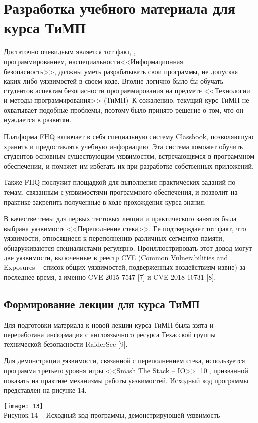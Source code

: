 \section{Разработка учебного материала для курса ТиМП}

Достаточно очевидным является тот факт,  ,  \\программированием, \hfil на\hfil специальности\hfil \hfil<<Информационная\hfil\\ безопасность>>, должны уметь разрабатывать свои программы, не допуская каких-либо уязвимостей в своем коде. Вполне логично было бы обучать студентов аспектам безопасности программирования на предмете <<Технологии и методы программирования>> (ТиМП). К сожалению, текущий курс ТиМП не охватывает подобные проблемы, поэтому было принято решение о том, что он нуждается в развитии.\par 
Платформа FHQ включает в себя специальную систему Classbook, позволяющую хранить и предоставлять учебную информацию. Эта система поможет обучить студентов основным существующим уязвимостям, встречающимся в программном обеспечении, и поможет им избегать их при разработке собственных приложений.\par 
Также FHQ послужит площадкой для выполнения практических заданий по темам, связанным с уязвимостями программного обеспечения, и позволит на практике закрепить полученные в ходе прохождения курса знания.\par
В качестве темы для первых тестовых лекции и практического занятия была выбрана уязвимость <<Переполнение стека>>. Ее подтверждает тот факт, что уязвимости, относящиеся к переполнению различных сегментов памяти, обнаруживаются специалистами регулярно. Проиллюстрировать этот довод могут две уязвимости, включенные в реестр CVE (Common Vulnerabilities and Exposures – список общих уязвимостей, подверженных воздействиям извне) за последнее время, а именно CVE-2015-7547 [7] и CVE-2018-10731 [8].
\vspace{\baselineskip}

\subsection{Формирование лекции для курса ТиМП}
Для подготовки материала к новой лекции курса ТиМП была взята и переработана информация с англоязычного ресурса Техасской группы технической безопасности RaiderSec [9].\par
Для демонстрации уязвимости, связанной с переполнением стека, используется программа третьего уровня игры <<Smash The Stack -- IO>> [10], призванной показать на практике механизмы работы уязвимостей. Исходный код программы представлен на рисунке 14.\par
\begin{center}
\texttt{[image: 13]}\\
Рисунок 14 -- Исходный код программы, демонстрирующей уязвимость\\
\end{center}
\vspace{\baselineskip}

